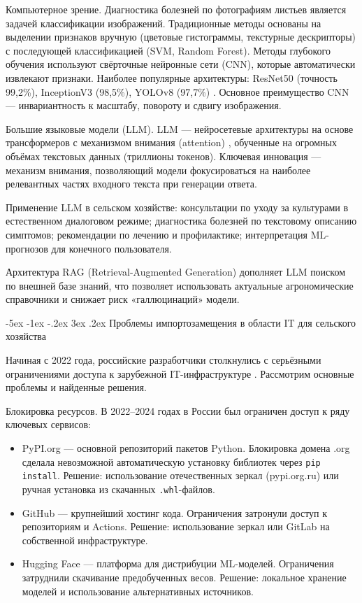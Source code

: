 \documentclass[14pt, a4paper]{extarticle}
\makeatletter
\renewcommand\subsection{\@startsection {subsection}{2}{\z@}%
    {-5ex \@plus -1ex \@minus -.2ex}%
    {3ex \@plus.2ex}%
    {\centering\large\bfseries}}
\makeatother
\begin{document}
    Компьютерное зрение. Диагностика болезней по фотографиям листьев является задачей классификации изображений. Традиционные методы основаны на выделении признаков вручную (цветовые гистограммы, текстурные дескрипторы) с последующей классификацией (SVM, Random Forest). Методы глубокого обучения используют свёрточные нейронные сети (CNN), которые автоматически извлекают признаки. Наиболее популярные архитектуры: ResNet50 (точность 99,2\%), InceptionV3 (98,5\%), YOLOv8 (97,7\%) \cite{yolo}. Основное преимущество CNN — инвариантность к масштабу, повороту и сдвигу изображения.

    Большие языковые модели (LLM). LLM — нейросетевые архитектуры на основе трансформеров с механизмом внимания (attention) \cite{attention}, обученные на огромных объёмах текстовых данных (триллионы токенов). Ключевая инновация — механизм внимания, позволяющий модели фокусироваться на наиболее релевантных частях входного текста при генерации ответа.

    Применение LLM в сельском хозяйстве: консультации по уходу за культурами в естественном диалоговом режиме; диагностика болезней по текстовому описанию симптомов; рекомендации по лечению и профилактике; интерпретация ML-прогнозов для конечного пользователя.

    Архитектура RAG (Retrieval-Augmented Generation) дополняет LLM поиском по внешней базе знаний, что позволяет использовать актуальные агрономические справочники и снижает риск «галлюцинаций» модели.

\subsection{Проблемы импортозамещения в области IT для сельского хозяйства}

    Начиная с 2022 года, российские разработчики столкнулись с серьёзными ограничениями доступа к зарубежной IT-инфраструктуре \cite{blocks}. Рассмотрим основные проблемы и найденные решения.

    Блокировка ресурсов. В 2022–2024 годах в России был ограничен доступ к ряду ключевых сервисов:
    
    \begin{itemize}
        \item PyPI.org — основной репозиторий пакетов Python. Блокировка домена .org сделала невозможной автоматическую установку библиотек через \texttt{pip install}. Решение: использование отечественных зеркал (pypi.org.ru) или ручная установка из скачанных \texttt{.whl}-файлов.
        \item GitHub — крупнейший хостинг кода. Ограничения затронули доступ к репозиториям и Actions. Решение: использование зеркал или GitLab на собственной инфраструктуре.
        \item Hugging Face — платформа для дистрибуции ML-моделей. Ограничения затруднили скачивание предобученных весов. Решение: локальное хранение моделей и использование альтернативных источников.
    \end{itemize}
\end{document}
